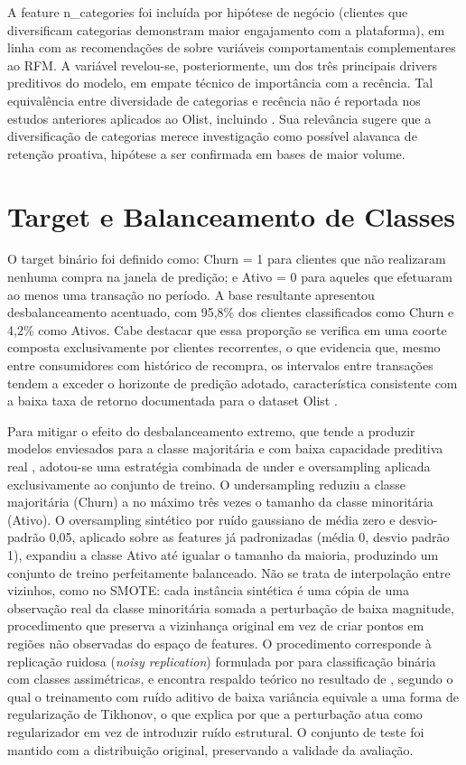 A feature n\_categories foi incluída por hipótese de negócio (clientes que diversificam categorias demonstram maior engajamento com a plataforma), em linha com as recomendações de  sobre variáveis comportamentais complementares ao RFM. A variável revelou-se, posteriormente, um dos três principais drivers preditivos do modelo, em empate técnico de importância com a recência. Tal equivalência entre diversidade de categorias e recência não é reportada nos estudos anteriores aplicados ao Olist, incluindo . Sua relevância sugere que a diversificação de categorias merece investigação como possível alavanca de retenção proativa, hipótese a ser confirmada em bases de maior volume.

\FloatBarrier
\section{Target e Balanceamento de Classes} \label{sec:target-balanceamento}

O target binário foi definido como: Churn = 1 para clientes que não realizaram nenhuma compra na janela de predição; e Ativo = 0 para aqueles que efetuaram ao menos uma transação no período. A base resultante apresentou desbalanceamento acentuado, com 95,8\% dos clientes classificados como Churn e 4,2\% como Ativos. Cabe destacar que essa proporção se verifica em uma coorte composta exclusivamente por clientes recorrentes, o que evidencia que, mesmo entre consumidores com histórico de recompra, os intervalos entre transações tendem a exceder o horizonte de predição adotado, característica consistente com a baixa taxa de retorno documentada para o dataset Olist \cite{matuszelanski2022}.

Para mitigar o efeito do desbalanceamento extremo, que tende a produzir modelos enviesados para a classe majoritária e com baixa capacidade preditiva real \cite{he2009}, adotou-se uma estratégia combinada de under e oversampling aplicada exclusivamente ao conjunto de treino. O undersampling reduziu a classe majoritária (Churn) a no máximo três vezes o tamanho da classe minoritária (Ativo). O oversampling sintético por ruído gaussiano de média zero e desvio-padrão 0,05, aplicado sobre as features já padronizadas (média 0, desvio padrão 1), expandiu a classe Ativo até igualar o tamanho da maioria, produzindo um conjunto de treino perfeitamente balanceado. Não se trata de interpolação entre vizinhos, como no SMOTE: cada instância sintética é uma cópia de uma observação real da classe minoritária somada a perturbação de baixa magnitude, procedimento que preserva a vizinhança original em vez de criar pontos em regiões não observadas do espaço de features. O procedimento corresponde à replicação ruidosa (\textit{noisy replication}) formulada por  para classificação binária com classes assimétricas, e encontra respaldo teórico no resultado de , segundo o qual o treinamento com ruído aditivo de baixa variância equivale a uma forma de regularização de Tikhonov, o que explica por que a perturbação atua como regularizador em vez de introduzir ruído estrutural. O conjunto de teste foi mantido com a distribuição original, preservando a validade da avaliação.

